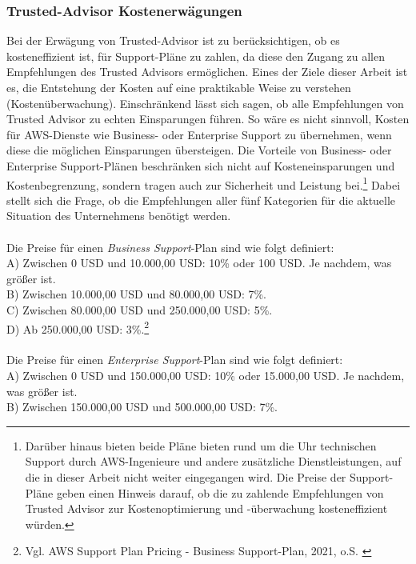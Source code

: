 \subsubsection*{Trusted-Advisor Kostenerwägungen}
Bei der Erwägung von Trusted-Advisor ist zu berücksichtigen, ob es kosteneffizient ist, für Support-Pläne zu zahlen, da diese den Zugang zu allen Empfehlungen des Trusted Advisors ermöglichen. Eines der Ziele dieser Arbeit ist es, die Entstehung der Kosten auf eine praktikable Weise zu verstehen (Kostenüberwachung). Einschränkend lässt sich sagen, ob alle Empfehlungen von Trusted Advisor zu echten Einsparungen führen. %
So wäre es nicht sinnvoll, Kosten für AWS-Dienste wie Business- oder Enterprise Support zu übernehmen, wenn diese die möglichen Einsparungen übersteigen. Die Vorteile von Business- oder Enterprise Support-Plänen beschränken sich nicht auf Kosteneinsparungen und Kostenbegrenzung, sondern tragen auch zur Sicherheit und Leistung bei.\footnote{Darüber hinaus bieten beide Pläne bieten rund um die Uhr technischen Support durch AWS-Ingenieure und andere zusätzliche Dienstleistungen, auf die in dieser Arbeit nicht weiter eingegangen wird. Die Preise der Support-Pläne geben einen Hinweis darauf, ob die zu zahlende Empfehlungen von Trusted Advisor zur Kostenoptimierung und -überwachung kosteneffizient würden.} Dabei stellt sich die Frage, ob die Empfehlungen aller fünf Kategorien für die aktuelle Situation des Unternehmens benötigt werden.
\\\\   
Die Preise für einen \textit{Business Support}-Plan sind wie folgt definiert: 
\\
A) Zwischen 0 USD und 10.000,00 USD: 10\% oder 100 USD. Je nachdem, was größer ist.\\
B) Zwischen 10.000,00 USD und 80.000,00 USD: 7\%.\\
C) Zwischen 80.000,00 USD und 250.000,00 USD: 5\%.\\
D) Ab 250.000,00 USD: 3\%.\footnote{Vgl.  AWS Support Plan Pricing - Business Support-Plan, 2021, o.S. \cite{AMZ38}}
\\\\
Die Preise für einen \textit{Enterprise Support}-Plan sind wie folgt definiert:
\\
A) Zwischen 0 USD und 150.000,00 USD: 10\% oder 15.000,00 USD. Je nachdem, was größer ist.\\
B) Zwischen 150.000,00 USD und 500.000,00 USD: 7\%.\\
